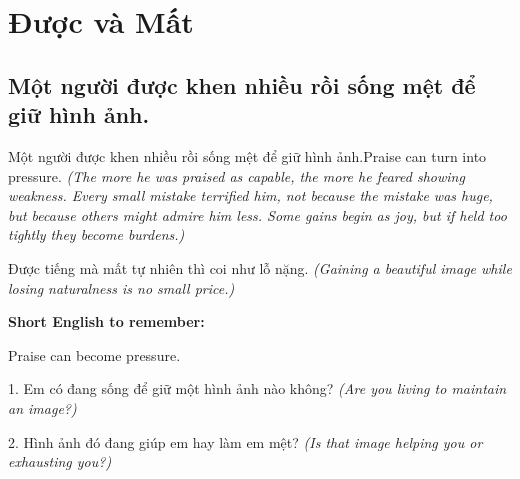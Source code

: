 \chapter{Được và Mất}

\section{Một người được khen nhiều rồi sống mệt để giữ hình ảnh.}
\begin{truyen}{Một người được khen nhiều rồi sống mệt để giữ hình ảnh.}{Praise can turn into pressure.}
\textit{(The more he was praised as capable, the more he feared showing weakness. Every small mistake terrified him, not because the mistake was huge, but because others might admire him less. Some gains begin as joy, but if held too tightly they become burdens.)}
\end{truyen}
\begin{baihoc}
Được tiếng mà mất tự nhiên thì coi như lỗ nặng.
\textit{(Gaining a beautiful image while losing naturalness is no small price.)}
\end{baihoc}
\begin{ghinhoanh}
\textbf{Short English to remember:}

Praise can become pressure.
\end{ghinhoanh}
\begin{tuhocnhanh}
1. Em có đang sống để giữ một hình ảnh nào không? \textit{(Are you living to maintain an image?)}

2. Hình ảnh đó đang giúp em hay làm em mệt? \textit{(Is that image helping you or exhausting you?)}
\end{tuhocnhanh}
\ngancach

